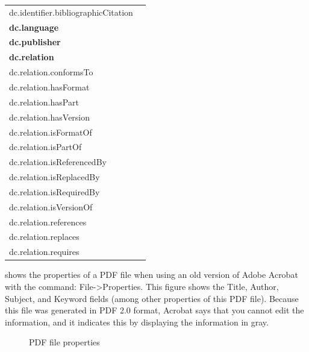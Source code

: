 \begin{table}[!ht]
\begin{footnotesize}
\begin{tabular}{l | l }
dc.identifier.bibliographicCitation\\
\textbf{dc.language}\\
\textbf{dc.publisher}\\
\textbf{dc.relation}\\
dc.relation.conformsTo\\
dc.relation.hasFormat\\
dc.relation.hasPart\\
dc.relation.hasVersion\\
dc.relation.isFormatOf\\
dc.relation.isPartOf\\
dc.relation.isReferencedBy\\
dc.relation.isReplacedBy\\
dc.relation.isRequiredBy\\
dc.relation.isVersionOf\\
dc.relation.references\\
dc.relation.replaces\\
dc.relation.requires\\
\end{tabular}
\end{footnotesize}
\end{table}
\FloatBarrier
\clearpage

 shows the properties of a PDF file when using an old version of Adobe Acrobat with the command: File->Properties. This figure shows the Title, Author, Subject, and Keyword fields (among other properties of this PDF file). Because this file was generated in PDF 2.0 format, Acrobat says that you cannot edit the information, and it indicates this by displaying the information in gray.
\begin{figure}[!ht]
  \begin{center}
  \end{center}
  \caption{PDF file properties}
  \label{fig:fileProperties}
\end{figure}
\FloatBarrier

